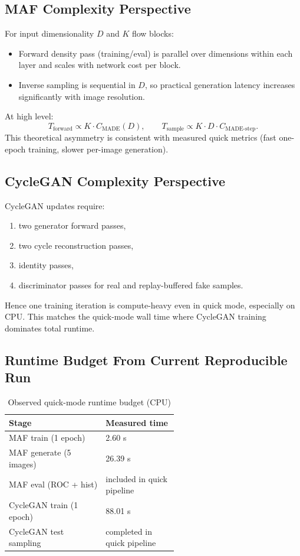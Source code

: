 \documentclass[conference]{IEEEtran}
\begin{document}
\subsection{MAF Complexity Perspective}
For input dimensionality $D$ and $K$ flow blocks:
\begin{itemize}
\item Forward density pass (training/eval) is parallel over dimensions within each layer and scales with network cost per block.
\item Inverse sampling is sequential in $D$, so practical generation latency increases significantly with image resolution.
\end{itemize}
At high level:
\begin{equation}
T_{\text{forward}} \propto K \cdot C_{\text{MADE}}(D),\qquad
T_{\text{sample}} \propto K \cdot D \cdot C_{\text{MADE-step}}.
\end{equation}
This theoretical asymmetry is consistent with measured quick metrics (fast one-epoch training, slower per-image generation).

\subsection{CycleGAN Complexity Perspective}
CycleGAN updates require:
\begin{enumerate}
\item two generator forward passes,
\item two cycle reconstruction passes,
\item identity passes,
\item discriminator passes for real and replay-buffered fake samples.
\end{enumerate}
Hence one training iteration is compute-heavy even in quick mode, especially on CPU. This matches the quick-mode wall time where CycleGAN training dominates total runtime.

\subsection{Runtime Budget From Current Reproducible Run}
\begin{table}[!t]
\centering
\caption{Observed quick-mode runtime budget (CPU)}
\begin{tabular}{|p{0.35\linewidth}|p{0.22\linewidth}|}
\hline
\textbf{Stage} & \textbf{Measured time} \\
\hline
MAF train (1 epoch) & 2.60 s \\
\hline
MAF generate (5 images) & 26.39 s \\
\hline
MAF eval (ROC + hist) & included in quick pipeline \\
\hline
CycleGAN train (1 epoch) & 88.01 s \\
\hline
CycleGAN test sampling & completed in quick pipeline \\
\hline
\end{tabular}
\end{table}
\end{document}
